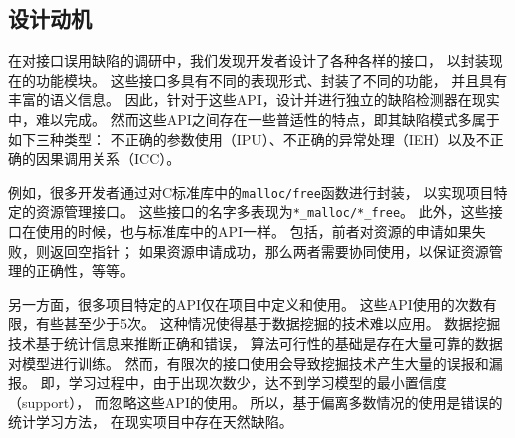 \subsection{设计动机}
在对接口误用缺陷的调研中，我们发现开发者设计了各种各样的接口，
以封装现在的功能模块。
这些接口多具有不同的表现形式、封装了不同的功能，
并且具有丰富的语义信息。
因此，针对于这些API，设计并进行独立的缺陷检测器在现实中，难以完成。
然而这些API之间存在一些普适性的特点，即其缺陷模式多属于如下三种类型：
不正确的参数使用（IPU）、不正确的异常处理（IEH）以及不正确的因果调用关系（ICC）。

例如，很多开发者通过对C标准库中的\texttt{malloc/free}函数进行封装，
以实现项目特定的资源管理接口。
这些接口的名字多表现为\texttt{*\_malloc/*\_free}。
此外，这些接口在使用的时候，也与标准库中的API一样。
包括，前者对资源的申请如果失败，则返回空指针；
如果资源申请成功，那么两者需要协同使用，以保证资源管理的正确性，等等。

另一方面，很多项目特定的API仅在项目中定义和使用。
这些API使用的次数有限，有些甚至少于5次。
这种情况使得基于数据挖掘的技术难以应用。
数据挖掘技术基于统计信息来推断正确和错误，
算法可行性的基础是存在大量可靠的数据对模型进行训练。
然而，有限次的接口使用会导致挖掘技术产生大量的误报和漏报。
即，学习过程中，由于出现次数少，达不到学习模型的最小置信度（support），
而忽略这些API的使用。
所以，基于偏离多数情况的使用是错误的统计学习方法，
在现实项目中存在天然缺陷。



